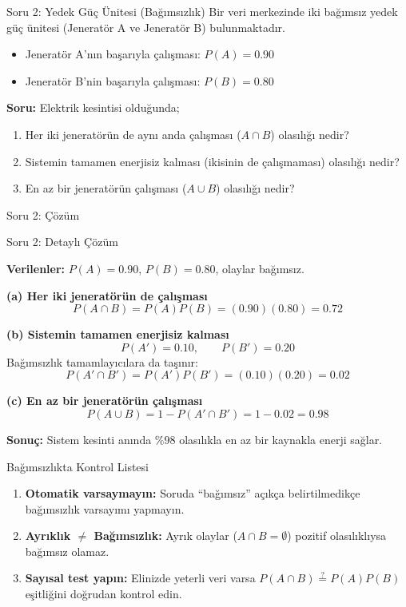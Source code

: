 \documentclass[light]{lutbeamer}
\begin{document}
\begin{frame}{Soru 2: Yedek Güç Ünitesi (Bağımsızlık)}
    Bir veri merkezinde iki bağımsız yedek güç ünitesi (Jeneratör A ve Jeneratör B) bulunmaktadır.
    \begin{itemize}
        \item Jeneratör A'nın başarıyla çalışması: $P(A) = 0.90$
        \item Jeneratör B'nin başarıyla çalışması: $P(B) = 0.80$
    \end{itemize}

    \textbf{Soru:} Elektrik kesintisi olduğunda;
    \begin{enumerate}
        \item[(a)] Her iki jeneratörün de aynı anda çalışması ($A \cap B$) olasılığı nedir?
        \item[(b)] Sistemin tamamen enerjisiz kalması (ikisinin de çalışmaması) olasılığı nedir?
        \item[(c)] En az bir jeneratörün çalışması ($A \cup B$) olasılığı nedir?
    \end{enumerate}
\end{frame}

\begin{frame}{Soru 2: Çözüm}
    \vspace{5cm}
\end{frame}

\begin{frame}[allowframebreaks]{Soru 2: Detaylı Çözüm}
    \small
    {\color{red}
    \textbf{Verilenler:} \(P(A)=0.90\), \(P(B)=0.80\), olaylar bağımsız.

    \textbf{(a) Her iki jeneratörün de çalışması}
    \[
    P(A\cap B)=P(A)P(B)=(0.90)(0.80)=\mathbf{0.72}
    \]

    \textbf{(b) Sistemin tamamen enerjisiz kalması}
    \[
    P(A')=0.10,\qquad P(B')=0.20
    \]
    Bağımsızlık tamamlayıcılara da taşınır:
    \[
    P(A'\cap B')=P(A')P(B')=(0.10)(0.20)=\mathbf{0.02}
    \]

    \textbf{(c) En az bir jeneratörün çalışması}
    \[
    P(A\cup B)=1-P(A'\cap B')=1-0.02=\mathbf{0.98}
    \]

    \textbf{Sonuç:} Sistem kesinti anında \(\%98\) olasılıkla en az bir kaynakla enerji sağlar.
    }
\end{frame}



\begin{frame}{Bağımsızlıkta Kontrol Listesi}
    \begin{enumerate}
        \item \textbf{Otomatik varsaymayın:} Soruda ``bağımsız'' açıkça belirtilmedikçe bağımsızlık varsayımı yapmayın.
        \item \textbf{Ayrıklık $\neq$ Bağımsızlık:} Ayrık olaylar ($A\cap B=\emptyset$) pozitif olasılıklıysa bağımsız olamaz.
        \item \textbf{Sayısal test yapın:} Elinizde yeterli veri varsa \(P(A\cap B)\stackrel{?}{=}P(A)P(B)\) eşitliğini doğrudan kontrol edin.
    \end{enumerate}
\end{frame}
\end{document}
